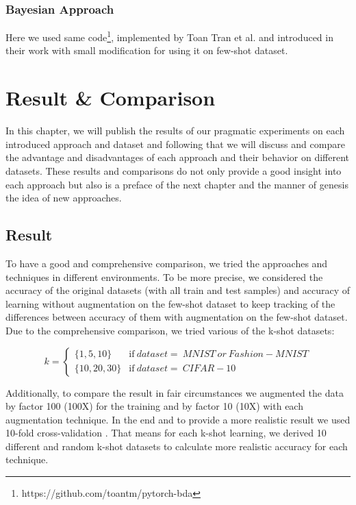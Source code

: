 \subsection{Bayesian Approach}
Here we used same code\footnote{https://github.com/toantm/pytorch-bda}, implemented by Toan Tran et
al. and introduced in their work \cite{refrence-bayesian-approach} with small modification for using
it on few-shot dataset.


\chapter{Result \& Comparison}
\label{tit:results}
In this chapter, we will publish the results of our pragmatic experiments on each introduced
approach and dataset and following that we will discuss and compare the advantage and disadvantages
of each approach and their behavior on different datasets. These results and comparisons do not only
provide a good insight into each approach but also is a preface of the next chapter and the manner
of genesis the idea of new approaches.

\section{Result}
To have a good and comprehensive comparison, we tried the approaches and techniques in different
environments. To be more precise, we considered the accuracy of the original datasets (with all
train and test samples) and accuracy of learning without augmentation on the few-shot dataset to
keep tracking of the differences between accuracy of them with augmentation on the few-shot dataset.
Due to the comprehensive comparison, we tried various of the k-shot datasets:

\begin{equation}
  k=
  \begin{cases}
    \{1, 5, 10\}   & \text{if}\ dataset=
    \ MNIST \ or \ Fashion-MNIST                    \\
    \{10, 20, 30\} & \text{if}\ dataset= \ CIFAR-10
  \end{cases}
\end{equation}

Additionally, to compare the result in fair circumstances we augmented the data by factor 100 (100X)
for the training and by factor 10 (10X) with each augmentation technique. In the end and to provide
a more realistic result we used 10-fold cross-validation \cite{cross-validation}. That means for each k-shot learning, we
derived 10 different and random k-shot datasets to calculate more realistic accuracy for each
technique.

